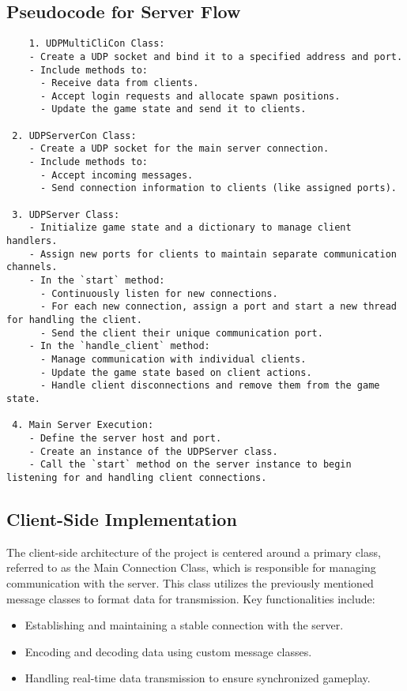 \subsection{Pseudocode for Server Flow}
\begin{verbatim}
    1. UDPMultiCliCon Class:
    - Create a UDP socket and bind it to a specified address and port.
    - Include methods to:
      - Receive data from clients.
      - Accept login requests and allocate spawn positions.
      - Update the game state and send it to clients.
 
 2. UDPServerCon Class:
    - Create a UDP socket for the main server connection.
    - Include methods to:
      - Accept incoming messages.
      - Send connection information to clients (like assigned ports).
 
 3. UDPServer Class:
    - Initialize game state and a dictionary to manage client handlers.
    - Assign new ports for clients to maintain separate communication channels.
    - In the `start` method:
      - Continuously listen for new connections.
      - For each new connection, assign a port and start a new thread for handling the client.
      - Send the client their unique communication port.
    - In the `handle_client` method:
      - Manage communication with individual clients.
      - Update the game state based on client actions.
      - Handle client disconnections and remove them from the game state.
 
 4. Main Server Execution:
    - Define the server host and port.
    - Create an instance of the UDPServer class.
    - Call the `start` method on the server instance to begin listening for and handling client connections.
\end{verbatim}

\subsection{Client-Side Implementation}
The client-side architecture of the project is centered around a primary class, referred to as the Main Connection Class, which is responsible for managing communication with the server. This class utilizes the previously mentioned message classes to format data for transmission. Key functionalities include:

\begin{itemize}
    \item Establishing and maintaining a stable connection with the server.
    \item Encoding and decoding data using custom message classes.
    \item Handling real-time data transmission to ensure synchronized gameplay.
\end{itemize}

